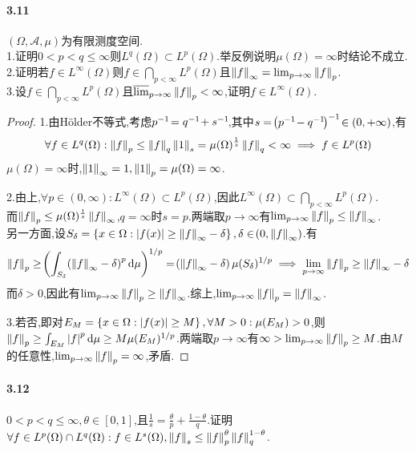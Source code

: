 \documentclass[UTF8]{article}
\begin{document}
\paragraph*{3.11}$(\Omega,\mathcal{A},\mu)$为有限测度空间.\\
1.证明$0<p<q\leq \infty$则$L^q(\Omega)\subset L^p(\Omega)$.举反例说明$\mu(\Omega)=\infty$时结论不成立.\\
2.证明若$f\in L^\infty(\Omega)$则$f\in\bigcap_{p<\infty}L^p(\Omega)$且$\left\|f\right\|_\infty=\lim_{p\to\infty}\left\|f\right\|_p$.\\
3.设$f\in\bigcap_{p<\infty}L^p(\Omega)$且$\varlimsup_{p\to \infty}\left\|f\right\|_p<\infty$,证明$f\in L^\infty(\Omega)$.

\begin{proof}
    1.由H\"older不等式,考虑$p^{-1}\!=q^{-1}\!+s^{-1}\!$,其中$s=\!\left(p^{-1}\!-q^{-1}\!\right)^{-1}\!\in (0,+\infty)$,有$$\forall f\in L^q(\Omega):\left\|f\right\|_p\leq \left\|f\right\|_q\left\|1\right\|_s=\mu(\Omega)^{\frac{1}{s}}\left\|f\right\|_q<\infty\implies f\in L^p(\Omega)$$
    $\mu(\Omega)=\infty$时,$\left\|1\right\|_\infty=1, \left\|1\right\|_p=\mu(\Omega)=\infty$.

    2.由上,$\forall p\in (0,\infty):L^\infty(\Omega)\subset L^p(\Omega)$,因此$L^\infty(\Omega)\subset \bigcap_{p<\infty}L^p(\Omega)$.\\
    而$\left\|f\right\|_p\leq \mu(\Omega)^{\frac{1}{s}}\left\|f\right\|_\infty$,$q=\infty$时$s=p$.两端取$p\to \infty$有$\lim_{p\to \infty}\left\|f\right\|_p\leq \left\|f\right\|_\infty$.\\
    另一方面,设$S_\delta=\left\{x\in\Omega:\left|f(x)\right|\geq \left\|f\right\|_\infty-\delta\right\},\delta\in \!\left(0,\left\|f\right\|_\infty\right)$.有$$\left\|f\right\|_p\geq \!\left(\int_{S_\delta}\!\left(\left\|f\right\|_\infty-\delta\right)^p\mathrm{d} \mu\right)^{1/p}=\!\left(\left\|f\right\|_\infty-\delta\right)\mu(S_\delta)^{1/p}\implies \lim_{p\to \infty}\left\|f\right\|_p\geq \left\|f\right\|_\infty-\delta$$
    而$\delta>0$,因此有$\lim_{p\to \infty}\left\|f\right\|_p\geq \left\|f\right\|_\infty$.综上,$\lim_{p\to \infty}\left\|f\right\|_p=\left\|f\right\|_\infty$.

    3.若否,即对$E_M=\left\{x\in \Omega:\left|f(x)\right|\geq M\right\},\forall M>0:\mu(E_M)>0$,则$\left\|f\right\|_p\geq \int_{E_M}\left|f\right|^p\mathrm{d} \mu\geq M\mu(E_M)^{1/p}$.两端取$p\to \infty$有$\infty>\lim_{p\to \infty}\left\|f\right\|_p\geq M$.由$M$的任意性,$\lim_{p\to \infty}\left\|f\right\|_p=\infty$,矛盾.
\end{proof}

\paragraph*{3.12}$0<p<q\leq \infty,\theta\in [0,1]$,且$\frac{1}{s}=\frac{\theta}{p}+\frac{1-\theta}{q}$.证明$\forall f\in L^p(\Omega)\cap L^q(\Omega):f\in L^s(\Omega),\left\|f\right\|_s\leq \left\|f\right\|_p^\theta\left\|f\right\|_q^{1-\theta}$.
\end{document}
